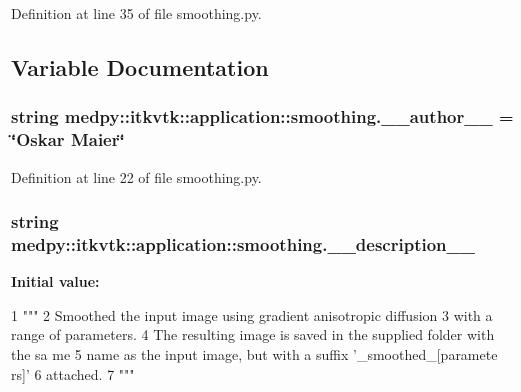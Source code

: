 Definition at line 35 of file smoothing.py.



\subsection{Variable Documentation}
\hypertarget{namespacemedpy_1_1itkvtk_1_1application_1_1smoothing_a21dc459f8206634a80975c36f839245f}{
\subsubsection[{\_\-\_\-author\_\-\_\-}]{\setlength{\rightskip}{0pt plus 5cm}string {\bf medpy::itkvtk::application::smoothing.\_\-\_\-author\_\-\_\-} = \char`\"{}Oskar Maier\char`\"{}}}
\label{namespacemedpy_1_1itkvtk_1_1application_1_1smoothing_a21dc459f8206634a80975c36f839245f}


Definition at line 22 of file smoothing.py.

\hypertarget{namespacemedpy_1_1itkvtk_1_1application_1_1smoothing_aafc7d3312cb186122d204535323667b7}{
\subsubsection[{\_\-\_\-description\_\-\_\-}]{\setlength{\rightskip}{0pt plus 5cm}string {\bf medpy::itkvtk::application::smoothing.\_\-\_\-description\_\-\_\-}}}
\label{namespacemedpy_1_1itkvtk_1_1application_1_1smoothing_aafc7d3312cb186122d204535323667b7}
{\bfseries Initial value:}
\begin{DoxyCode}
1 """
2                   Smoothed the input image using gradient anisotropic diffusion
3                   with a range of parameters.
4                   The resulting image is saved in the supplied folder with the sa
      me
5                   name as the input image, but with a suffix '_smoothed_[paramete
      rs]'
6                   attached.
7                   """
\end{DoxyCode}


